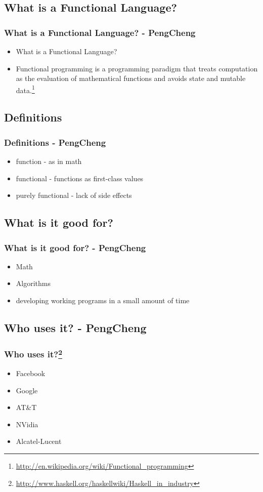 \documentclass[xcolor=pdftex,dvipsnames,table]{beamer}
\begin{document}
\subsection{What is a Functional Language?}
\begin{frame}
  \frametitle{What is a Functional Language? - PengCheng}
  \begin{itemize}
  \item What is a Functional Language?
  \item Functional programming is a programming paradigm that treats computation as the evaluation of mathematical functions and avoids state and mutable data.\footnote{\url{http://en.wikipedia.org/wiki/Functional_programming}}
  \end{itemize}
\end{frame}

\subsection{Definitions}
\begin{frame}
  \frametitle{Definitions - PengCheng}
  \begin{itemize}
  \item function - as in math
  \item functional - functions as first-class values
  \item purely functional - lack of side effects
  \end{itemize}
\end{frame}

\subsection{What is it good for?}
\begin{frame}
  \frametitle{What is it good for?  - PengCheng}
  \begin{itemize}
  \item Math
  \item Algorithms
  \item developing working programs in a small amount of time
  \end{itemize}
\end{frame}

\subsection{Who uses it? - PengCheng}
\begin{frame}
  \frametitle{Who uses it?\footnote{\url{http://www.haskell.org/haskellwiki/Haskell_in_industry}}}
  \begin{itemize}
  \item Facebook
  \item Google
  \item AT\&T
  \item NVidia
  \item Alcatel-Lucent
  \end{itemize}
\end{frame}
\end{document}
